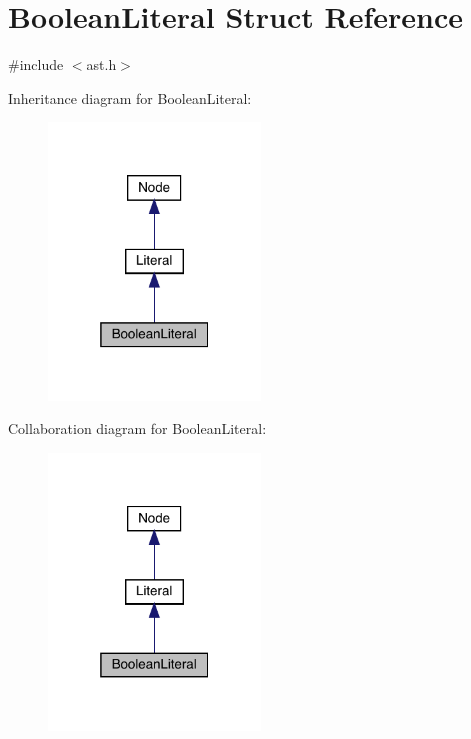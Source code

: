 \hypertarget{struct_boolean_literal}{}\section{Boolean\+Literal Struct Reference}
\label{struct_boolean_literal}


{\ttfamily \#include $<$ast.\+h$>$}



Inheritance diagram for Boolean\+Literal\+:
\nopagebreak
\begin{figure}[H]
\begin{center}
\leavevmode
\includegraphics[width=160pt]{struct_boolean_literal__inherit__graph}
\end{center}
\end{figure}


Collaboration diagram for Boolean\+Literal\+:
\nopagebreak
\begin{figure}[H]
\begin{center}
\leavevmode
\includegraphics[width=160pt]{struct_boolean_literal__coll__graph}
\end{center}
\end{figure}
